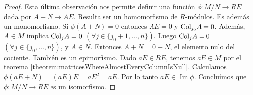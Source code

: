 \documentclass{report}
\newcommand{\Col}{\textnormal{Col}}
\DeclareMathOperator{\image}{\text{Im}}
\begin{document}
\begin{proof}
    Esta última observación nos permite definir una función \(\phi : M / N \rightarrow R E\) dada por \(A + N \mapsto A E\).
    Resulta ser un homomorfismo de \(R\)-módulos.
    Es además un monomorfismo.
    Si \(\phi(A + N) = 0\) entonces \(A E = 0\) y \(\Col_{j_0} A = 0\).
    Además, \(A \in M\) implica \(\Col_j A = 0\) \((\forall j \in \{j_0 + 1, \dots, n\})\).
    Luego \(\Col_j A = 0\) \((\forall j \in \{j_0, \dots, n\})\), y \(A \in N\).
    Entonces \(A + N = 0 + N\), el elemento nulo del cociente.
    También es un epimorfismo.
    Dado \(a E \in R E\), tenemos \(a E \in M\) por el teorema \ref{theorem:matricesWhereAlmostEveryColumnIsNull}.
    Calculamos \(\phi(a E + N)= (a E) E = a E^2 = a E\).
    Por lo tanto \(a E \in \image \phi\).
    Concluímos que \(\phi : M / N \rightarrow R E\) es un isomorfismo.
  \end{proof}
\end{document}
